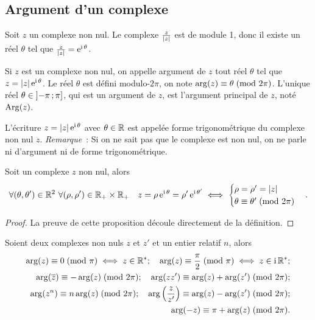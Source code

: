 \subsection{Argument d'un complexe}
\label{subsec:argumentcomplexe}
Soit \(z\) un complexe non nul. Le complexe \(\frac{z}{\left\lvert z\right\rvert}\) est de module 
1, donc il existe un réel \(\theta\) tel que 
\(\frac{z}{\left\lvert z\right\rvert} = \operatorname{e}^{\operatorname{i} \theta}\).
\begin{defdef}
    Si \(z\) est un complexe non nul, on appelle argument de \(z\) tout réel 
    \(\theta\) tel que \(z = \left\lvert z\right\rvert \operatorname{e}^{\operatorname{i} \theta}\).  Le réel \(\theta\) est 
    défini modulo-\(2\pi\), on note \(\arg(z) \equiv \theta\!\pmod {2\pi}\). L'unique 
    réel \(\theta \in \left] -\pi \, ;  \pi \right]\), qui est un argument de \(z\), 
    est l'argument principal de \(z\), noté \(\operatorname{Arg}(z)\).
\end{defdef}
L'écriture \(z = \left\lvert z\right\rvert \operatorname{e}^{\operatorname{i} \theta}\) avec \(\theta \in \mathbb{R}\) est appelée forme 
trigonométrique du complexe non nul \(z\).
\emph{Remarque}~: Si on ne sait pas que le complexe est non nul, on ne parle ni d'argument ni de forme trigonométrique.
\begin{prop}
    Soit un complexe \(z\) non nul, alors
    \begin{equation}
        \forall (\theta, \theta') \in \mathbb{R}^2 \ \forall (\rho, \rho') \in \mathbb{R}_{+} 
        \times \mathbb{R}_{+} \quad z = \rho \operatorname{e}^{\operatorname{i} \theta} = \rho' \operatorname{e}^{\operatorname{i} \theta'} \iff
        \begin{cases}
            \rho = \rho' = \left\lvert z\right\rvert \\
            \theta \equiv \theta'\!\pmod {2\pi}
        \end{cases}.
    \end{equation}
\end{prop}
\begin{proof}
    La preuve de cette proposition découle directement de la définition.
\end{proof}
\begin{prop}
    Soient deux complexes non nuls \(z\) et \(z'\) et un entier relatif \(n\), 
    alors
    \begin{align*}
        \arg(z) \equiv 0\!\pmod {\pi} \iff z \in \mathbb{R}^*; \quad 
        \arg(z) \equiv \frac{\pi}{2}\!\pmod {\pi} \iff z \in \operatorname{i}\mathbb{R}^{*};\\
        \arg(\overline{z}) \equiv -\arg(z)\!\pmod {2\pi}; \quad \arg(z 
        z') \equiv \arg(z) + \arg(z')\!\pmod {2\pi}; \\
        \arg(z^n) \equiv n \arg(z)\!\pmod {2\pi}; \quad \arg 
        \left(\frac{z}{z'} \right) \equiv \arg(z) - \arg(z') \!\pmod {2\pi}; \\
        \arg(-z) \equiv \pi + \arg(z)\!\pmod {2\pi}.
    \end{align*}
\end{prop}

